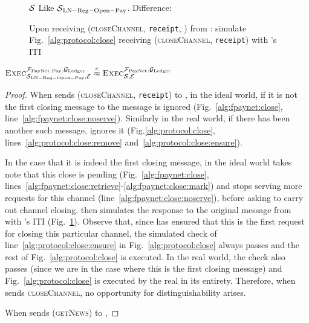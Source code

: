 \begin{figure}[H]
  \begin{simulatorbox}{$\mathcal{S}$}
    Like $\mathcal{S}{}_{\mathrm{LN - Reg - Open - Pay}}$. Difference:
    \begin{algorithmic}[1]
      \State Upon receiving (\textsc{closeChannel}, \texttt{receipt}, \alice)
      from \fpaynet:
      \Indent
        \State simulate Fig.~\ref{alg:protocol:close} receiving
        (\textsc{closeChannel}, \texttt{receipt}) with \alice's ITI
      \EndIndent
    \end{algorithmic}
  \end{simulatorbox}
  \caption{}
  \label{alg:sim:close}
\end{figure}

\begin{lemma}
  \label{lemma:close}
  $\textsc{Exec}^{\mathcal{F}_{\mathrm{PayNet}}{}_{\mathrm{, Pay}}, \mathcal{G}_{\mathrm{Ledger}}}_{\mathcal{S}_{\mathrm{LN
  - Reg - Open - Pay}}, \mathcal{E}} \overset{c}{\approx}
  \textsc{Exec}^{\mathcal{F}_{\mathrm{PayNet}}, \mathcal{G}_{\mathrm{Ledger}}}_{\mathcal{S}, \mathcal{E}}$
\end{lemma}

\begin{proof}
  When \environment{} sends (\textsc{closeChannel}, \texttt{receipt}) to \alice,
  in the ideal world, if it is not the first closing message to \alice{} the
  message is ignored (Fig.~\ref{alg:fpaynet:close},
  line~\ref{alg:fpaynet:close:noserve}). Similarly in the real world, if there
  has been another such message, \alice{} ignores it
  (Fig.\ref{alg:protocol:close}, lines~\ref{alg:protocol:close:remove}
  and~\ref{alg:protocol:close:ensure}).

  In the case that it is indeed the first closing message, in the ideal world
  \fpaynet{} takes note that this close is pending
  (Fig.~\ref{alg:fpaynet:close},
  lines~\ref{alg:fpaynet:close:retrieve}-\ref{alg:fpaynet:close:mark}) and stops
  serving more requests for this channel (line~\ref{alg:fpaynet:close:noserve}),
  before asking \simulator{} to carry out channel closing. \simulator{} then
  simulates the response to the original message from \environment{} with
  \alice's ITI (Fig.~\ref{alg:sim:close}). Observe that, since \fpaynet{} has
  ensured that this is the first request for closing this particular channel,
  the simulated check of line~\ref{alg:protocol:close:ensure} in
  Fig.~\ref{alg:protocol:close} always passes and the rest of
  Fig.~\ref{alg:protocol:close} is executed. In the real world, the check also
  passes (since we are in the case where this is the first closing message) and
  Fig.~\ref{alg:protocol:close} is executed by the real \alice{} in its
  entirety. Therefore, when \environment{} sends \textsc{closeChannel}, no
  opportunity for distinguishability arises.

  When \environment{} sends (\textsc{getNews}) to \alice,
\end{proof}
